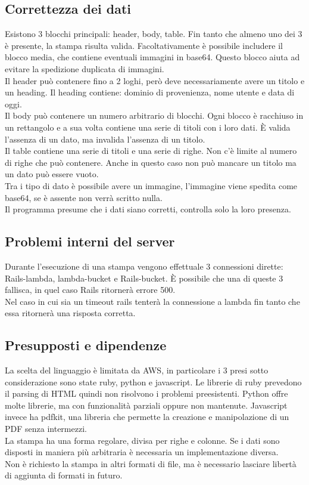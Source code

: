 \documentclass[12pt]{article}
\begin{document}
\subsection{Correttezza dei dati}
Esistono 3 blocchi principali: header, body, table.
Fin tanto che almeno uno dei 3 è presente, la stampa risulta valida.
Facoltativamente è possibile includere il blocco media, che contiene 
eventuali immagini in base64. Questo blocco aiuta ad evitare la spedizione duplicata 
di immagini.
\\ Il header può contenere fino a 2 loghi, però deve necessariamente avere 
un titolo e un heading. Il heading contiene: dominio di provenienza, nome utente 
e data di oggi.
\\ Il body può contenere un numero arbitrario di blocchi. Ogni blocco è racchiuso 
in un rettangolo e a sua volta contiene una serie di titoli con i loro dati. 
È valida l'assenza di un dato, ma invalida l'assenza di un titolo. 
\\ Il table contiene una serie di titoli e una serie di righe. Non c'è limite 
al numero di righe che può contenere.
Anche in questo caso non può mancare un titolo ma un dato può essere vuoto. 
\\ Tra i tipo di dato è possibile avere un immagine, l'immagine viene spedita come 
base64, se è assente non verrà scritto nulla. 
\\ Il programma presume che i dati siano corretti, controlla solo la loro presenza.

\subsection{Problemi interni del server}
Durante l'esecuzione di una stampa vengono effettuale 3 connessioni dirette:
Rails-lambda, lambda-bucket e Rails-bucket. È possibile che una di queste 3 
fallisca, in quel caso Rails ritornerà errore 500.
\\ Nel caso in cui sia un timeout rails tenterà la connessione a lambda fin tanto 
che essa ritornerà una risposta corretta. 

\subsection{Presupposti e dipendenze}
La scelta del linguaggio è limitata da AWS, in particolare i 3 presi sotto considerazione 
sono state ruby, python e javascript. 
Le librerie di ruby prevedono il parsing di HTML quindi non risolvono i problemi 
preesistenti. 
Python offre molte librerie, ma con funzionalità parziali oppure non mantenute. 
Javascript invece ha pdfkit, una libreria che permette la creazione e manipolazione 
di un PDF senza intermezzi. 
\\ La stampa ha una forma regolare, divisa per righe e colonne. Se i dati sono 
disposti in maniera più arbitraria è necessaria un implementazione diversa. 
\\ Non è richiesto la stampa in altri formati di file, ma è necessario lasciare 
libertà di aggiunta di formati in futuro.
\end{document}
